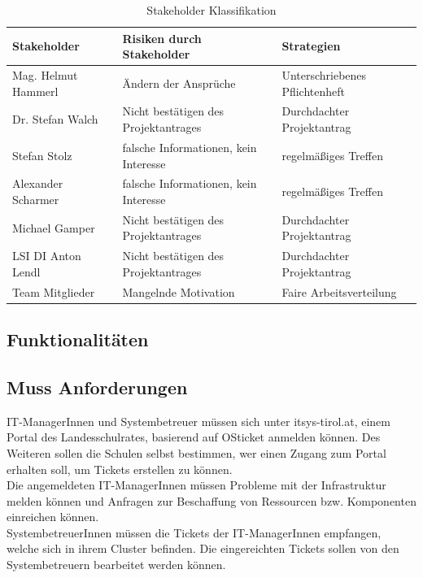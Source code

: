 \begin{table}[h]
	\centering
	\begin{tabular}{|lll|}
		\hline
		Stakeholder          & Risiken durch Stakeholder                        & Strategien                                            \\ \hline
		Mag. Helmut Hammerl & Ändern der Ansprüche          & Unterschriebenes Pflichtenheft  \\
		Dr. Stefan Walch      & Nicht bestätigen des Projektantrages             & Durchdachter Projektantrag                            \\
		Stefan Stolz         & falsche Informationen, kein Interesse & regelmäßiges Treffen             \\
		Alexander Scharmer   & falsche Informationen, kein Interesse & regelmäßiges Treffen              \\
		Michael Gamper       & Nicht bestätigen des Projektantrages             & Durchdachter Projektantrag                            \\
		LSI DI Anton Lendl   & Nicht bestätigen des Projektantrages             & Durchdachter Projektantrag                            \\
		Team Mitglieder      & Mangelnde Motivation                             & Faire Arbeitsverteilung           \\ \hline			
	\end{tabular}
	\caption{Stakeholder Klassifikation}
	\label{Tbl_Stakeholder_Klassifikation}
\end{table}


\subsection{Funktionalitäten}
\subsection{Muss Anforderungen}
IT-ManagerInnen und Systembetreuer müssen sich unter itsys-tirol.at, einem Portal des Landesschulrates, basierend auf OSticket anmelden können. Des Weiteren sollen die Schulen selbst bestimmen, wer einen Zugang zum Portal erhalten soll, um Tickets erstellen zu können.
\\
Die angemeldeten IT-ManagerInnen müssen Probleme mit der Infrastruktur melden können und Anfragen zur Beschaffung von Ressourcen bzw. Komponenten einreichen können.
\\
SystembetreuerInnen müssen die Tickets der IT-ManagerInnen empfangen, welche sich in ihrem Cluster befinden. Die eingereichten Tickets sollen von den Systembetreuern bearbeitet werden können.


